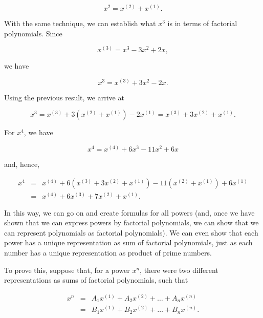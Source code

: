 \documentclass[tikz]{scrreprt}
\begin{document}
\begin{equation}
x^2 = x^{(2)} + x^{(1)}.
\end{equation}

With the same technique, we can establish 
what $x^3$ is in terms of factorial polynomials.
Since

\begin{equation}
x^{(3)} = x^3 - 3x^2 + 2x,
\end{equation}

we have

\begin{equation}
x^3 = x^{(3)} + 3x^2 - 2x.
\end{equation}

Using the previous result, we arrive at

\begin{equation}
x^3 = x^{(3)} + 3(x^{(2)} + x^{(1)}) - 2x^{(1)} =
      x^{(3)} + 3x^{(2)} + x^{(1)}.
\end{equation}

For $x^4$, we have

\begin{equation}
x^4 = x^{(4)} + 6x^3 - 11x^2 + 6x 
\end{equation}

and, hence,

\[
\begin{array}{lcl}
x^4 & = & x^{(4)} + 6(x^{(3)} + 3x^{(2)} + x^{(1)}) - 11(x^{(2)} + x^{(1)}) + 6x^{(1)} \\
    & = & x^{(4)} + 6x^{(3)} + 7x^{(2)} + x^{(1)}.
\end{array}
\]

In this way, we can go on and create formulas for all powers
(and, once we have shown that we can express powers by
factorial polynomials, we can show that we can represent
polynomials as factorial polynomials).
We can even show that each power has a unique representation
as sum of factorial polynomials, just as each number
has a unique representation as product of prime numbers.

To prove this, suppose that, for a power $x^n$,
there were two different representations as sums of
factorial polynomials, such that

\begin{equation}
\begin{array}{lcl}
x^n & = & A_1x^{(1)} + A_2x^{(2)} + \dots + A_nx^{(n)}\\
    & = & B_1x^{(1)} + B_2x^{(2)} + \dots + B_nx^{(n)}.
\end{array}
\end{equation}
\end{document}
